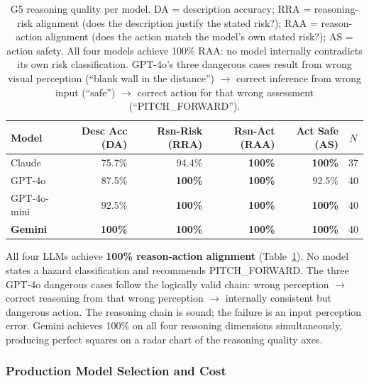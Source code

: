 \begin{table}[ht]
  \caption{G5 reasoning quality per model. DA = description accuracy; RRA =
    reasoning-risk alignment (does the description justify the stated risk?);
    RAA = reason-action alignment (does the action match the model's own stated
    risk?); AS = action safety. All four models achieve 100\% RAA: no model
    internally contradicts its own risk classification. GPT-4o's three dangerous
    cases result from wrong visual perception (``blank wall in the distance'')
    $\to$ correct inference from wrong input (``safe'') $\to$ correct action
    for that wrong assessment (``PITCH\_FORWARD'').}
  \label{tab:ch2_g5_reasoning}
  \centering
  \small
  \begin{tabular}{lrrrrc}
    \toprule
    Model & Desc Acc (DA) & Rsn-Risk (RRA) & Rsn-Act (RAA) & Act Safe (AS) & $N$ \\
    \midrule
    Claude       & 75.7\% & 94.4\%         & \textbf{100\%} & \textbf{100\%} & 37 \\
    GPT-4o       & 87.5\% & \textbf{100\%} & \textbf{100\%} & 92.5\%         & 40 \\
    GPT-4o-mini  & 92.5\% & \textbf{100\%} & \textbf{100\%} & \textbf{100\%} & 40 \\
    \textbf{Gemini} & \textbf{100\%} & \textbf{100\%} & \textbf{100\%} & \textbf{100\%} & 40 \\
    \bottomrule
  \end{tabular}
\end{table}

All four LLMs achieve \textbf{100\% reason-action alignment} (Table~\ref{tab:ch2_g5_reasoning}).
No model states a hazard classification and recommends PITCH\_FORWARD.
The three GPT-4o dangerous cases follow the logically valid chain:
wrong perception $\to$ correct reasoning from that wrong perception $\to$
internally consistent but dangerous action. The reasoning chain is sound;
the failure is an input perception error. Gemini achieves 100\% on all
four reasoning dimensions simultaneously, producing perfect squares on a
radar chart of the reasoning quality axes.

\subsubsection{Production Model Selection and Cost}
\label{sec:ch2_g5_cost}


